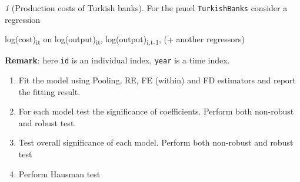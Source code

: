 \documentclass[12pt]{article}
\theoremstyle{remark}
\newtheorem{exercise}{}[section]
\begin{document}
\begin{exercise}[Production costs of Turkish banks]
For the panel \texttt{TurkishBanks} consider a regression
\begin{center}
	log(cost)\textsubscript{it} on log(output)\textsubscript{it},  
	log(output)\textsubscript{i,t-1}, (+ another regressors)  
\end{center}
\textbf{Remark}: here \texttt{id} is an individual index, 
\texttt{year} is a time index.
\begin{enumerate}
	\item Fit the model using Pooling, RE, FE (within) and FD estimators
	and report the fitting result.
	\item For each model test the significance of coefficients. Perform both
	non-robust and robust test.
	\item Test overall significance of each model. Perform both
	non-robust and robust test
	\item Perform Hausman test
\end{enumerate}
\end{exercise}
\end{document}
